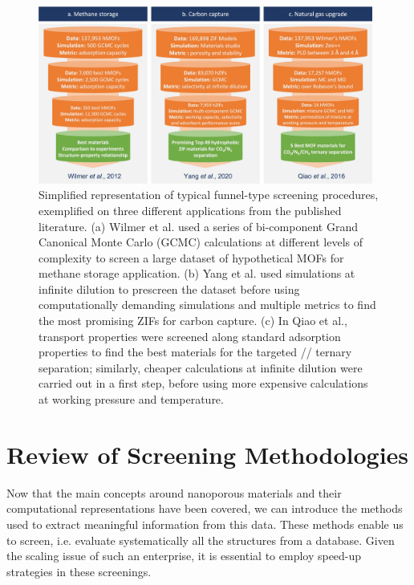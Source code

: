\documentclass[main.tex]{subfiles}
\begin{document}
\begin{figure}[t]
  \centering
    \includegraphics[width=0.98\textwidth]{figures/1-screening/Screening_procedures.jpg}
    \caption{Simplified representation of typical funnel-type screening procedures, exemplified on three different applications from the published literature. (a) Wilmer et al.\autocite{Wilmer_2012} used a series of bi-component Grand Canonical Monte Carlo (GCMC) calculations at different levels of complexity to screen a large dataset of hypothetical MOFs for methane storage application. (b) Yang et al.\autocite{Yang_2020} used simulations at infinite dilution to prescreen the dataset before using computationally demanding simulations and multiple metrics to find the most promising ZIFs for carbon capture. (c) In Qiao et al.\autocite{Qiao_2016}, transport properties were screened along standard adsorption properties to find the best materials for the targeted // ternary separation; similarly, cheaper calculations at infinite dilution were carried out in a first step, before using more expensive calculations at working pressure and temperature.}\label{fgr:screening}
\end{figure}


\section{Review of Screening Methodologies}

Now that the main concepts around nanoporous materials and their computational representations have been covered, we can introduce the methods used to extract meaningful information from this data. These methods enable us to screen, i.e. evaluate systematically all the structures from a database. Given the scaling issue of such an enterprise, it is essential to employ speed-up strategies in these screenings. 
\end{document}
